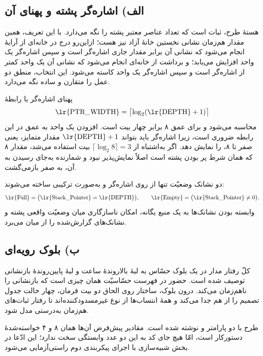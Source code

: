 \documentclass[12pt,a4paper]{article}
\begin{document}
	\subsection*{الف) اشاره‌گر پشته و پهنای آن}
	هستهٔ طرح، ثبات  است که تعداد عناصر معتبر پشته را نگه می‌دارد. با این تعریف، همین مقدار هم‌زمان نشانی نخستین خانهٔ آزاد نیز هست؛ ازاین‌رو درج در خانه‌ای از آرایهٔ  انجام می‌شود که نشانی آن برابر مقدار جاری اشاره‌گر است و سپس اشاره‌گر یک واحد افزایش می‌یابد؛ و برداشت از خانه‌ای انجام می‌شود که نشانی آن یک واحد کمتر از اشاره‌گر است و سپس اشاره‌گر یک واحد کاسته می‌شود. این انتخاب، منطق دو عمل را متقارن و ساده نگه می‌دارد.

	پهنای اشاره‌گر با رابطهٔ
	\[
	\text{\lr{PTR\_WIDTH}} = \bigl\lceil \log_2 (\text{\lr{DEPTH}}+1) \bigr\rceil
	\]
	محاسبه می‌شود و برای عمق ۸ برابر چهار بیت است. افزودن یک واحد به عمق در این رابطه ضروری است، زیرا اشاره‌گر باید بتواند \(\text{\lr{DEPTH}}+1\) مقدار متمایز، یعنی صفر تا ۸، را نمایش دهد. اگر به‌اشتباه از \(\lceil\log_2 8\rceil=3\) بیت استفاده می‌شد، مقدار ۸ که همان شرط پر بودن پشته است اصلاً نمایش‌پذیر نبود و شمارنده به‌جای رسیدن به آن، به صفر بازمی‌گشت.

	دو نشانک وضعیّت تنها از روی اشاره‌گر و به‌صورت ترکیبی ساخته می‌شوند:
	\[
	\text{\lr{Full}} = \bigl(\text{\lr{Stack\_Pointer}} = \text{\lr{DEPTH}}\bigr),
	\qquad
	\text{\lr{Empty}} = \bigl(\text{\lr{Stack\_Pointer}} \neq 0\bigr).
	\]
	وابسته بودن نشانک‌ها به یک منبع یگانه، امکان ناسازگاری میان وضعیّت واقعی پشته و نشانک‌های گزارش‌شده را از میان می‌برد.

	\subsection*{ب) بلوک رویه‌ای}
	کلّ رفتار مدار در یک بلوک  حسّاس به لبهٔ بالاروندهٔ ساعت و لبهٔ پایین‌روندهٔ بازنشانی توصیف شده است. حضور  در فهرست حسّاسیّت همان چیزی است که بازنشانی را ناهم‌زمان می‌کند. درون بلوک، ساختار  روی الحاق دو بیت فرمان، چهار حالت جدول تصمیم را از هم جدا می‌کند و همهٔ انتساب‌ها از نوع غیرمسدودکننده‌اند تا رفتار ثبات‌های هم‌زمان به‌درستی مدل شود.

	طرح با دو پارامتر  و  نوشته شده است. مقادیر پیش‌فرض آن‌ها همان ۸ و ۴ خواسته‌شدهٔ دستورکار است، امّا هیچ جای کد به این دو عدد وابستگی سخت ندارد؛ این ادّعا در بخش شبیه‌سازی با اجرای پیکربندی دوم راستی‌آزمایی می‌شود.

\end{document}
